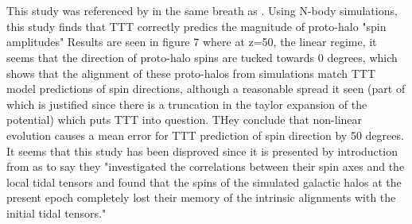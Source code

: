 \documentclass[fleqn,usenatbib]{mnras}
\begin{document}
\section{\citet{Porciani_02}}
This study was referenced by \citet{Trowland_13} in the same breath as \citet{Lee_pen_00}.
Using N-body simulations, this study finds that TTT correctly predics the magnitude of proto-halo "spin amplitudes"
Results are seen in figure 7 where at z=50, the linear regime, it seems that the direction of proto-halo spins are tucked towards 0 degrees, which shows that the alignment of these proto-halos from simulations match TTT model predictions of spin directions, although a reasonable spread it seen (part of which is justified since there is a truncation in the taylor expansion of the potential) which puts TTT into question.
THey conclude that non-linear evolution causes a mean error for TTT prediction of spin direction by 50 degrees. It seems that this study has been disproved since it is presented by introduction from \citet{Lee_Erdogdu_07} as to say they "investigated the correlations between their spin axes and the local tidal tensors and found that the spins of the simulated galactic halos at the present epoch completely lost their memory of the intrinsic alignments with the initial tidal tensors."
\end{document}
